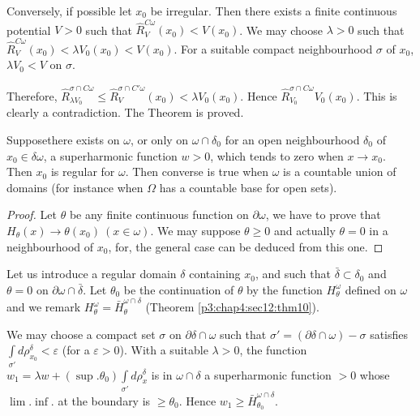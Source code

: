 Conversely, if possible let $x_0$ be irregular. Then there exists a
finite continuous potential $V > 0$ such that $\hat{R}^{C \omega}_V
(x_0) < V(x_0)$. We may choose $\lambda > 0$ such that $\hat{R}^{C
  \omega}_V (x_0) < \lambda V_0(x_0) < V(x_0)$. 
For a suitable compact neighbourhood $\sigma $ of $x_0$, $\lambda V_0
< V$ on $\sigma$. 

Therefore, $\hat{R}^{\sigma \cap C \omega}_{\lambda V_0} \leq
\hat{R}^{\sigma \cap C' \omega}_V (x_0) < \lambda V_0(x_0)$. Hence $\hat{R}^{\sigma
  \cap C \omega}_{V_0} V_0(x_0)$. This is clearly a contradiction. The
Theorem is proved. 

\begin{thm}\label{p4:chap6:sec29:thm22} %
  Suppose\pageoriginale there exists on $\omega$, or only on $\omega \cap \delta_0$
  for an open neighbourhood $\delta_0$ of $x_0 \in \delta \omega$, a
  superharmonic function $w > 0$, which tends to zero when $x \to
  x_0$. Then $x_0$ is regular for $\omega$. Then converse is true when
  $\omega$ is a countable union of domains (for instance when  $\Omega$
  has a  countable base for open sets). 
\end{thm}

\begin{proof}
  Let $\theta$ be any finite continuous function on $\partial \omega$,
  we have to prove that $H_\theta (x) \to \theta (x_0)~ (x \in
  \omega)$. We may suppose $\theta \geq 0$ and actually $\theta = 0$
  in a neighbourhood of $x_0$, for, the general case can be deduced
  from this one. 
\end{proof}

Let us introduce a regular domain $\delta$ containing $x_0$, and such
that $\bar{\delta}\subset \delta_0$ and $\theta = 0$ on $\partial
\omega \cap \bar{\delta}$. Let $\theta_0$ be the continuation of
$\theta$ by the function $H^\omega_\theta$ defined on $\omega$ and we
remark $H^\omega_\theta = \bar{H}^{\omega \cap \delta}_\theta$
(Theorem \ref{p3:chap4:sec12:thm10}). 

We may choose a compact set $\sigma$ on $\partial \delta \cap \omega$
such that $\sigma' = (\partial \delta \cap \omega) - \sigma $
satisfies $\int \limits_{\sigma'} d \rho^\delta_{x_0} < \varepsilon$
(for a $\varepsilon > 0$). With a suitable $\lambda > 0$, the function
$w_1 = \lambda w + (\sup. \theta_0) \int \limits_{\sigma'} d
\rho^\delta_x$ is in $\omega \cap \delta$ a superharmonic function $>
0$ whose $\lim. \inf$. at the boundary is $\geq \theta_0$. Hence $w_1
\geq \bar{H}^{\omega \cap \delta}_{\theta_0}$. 

